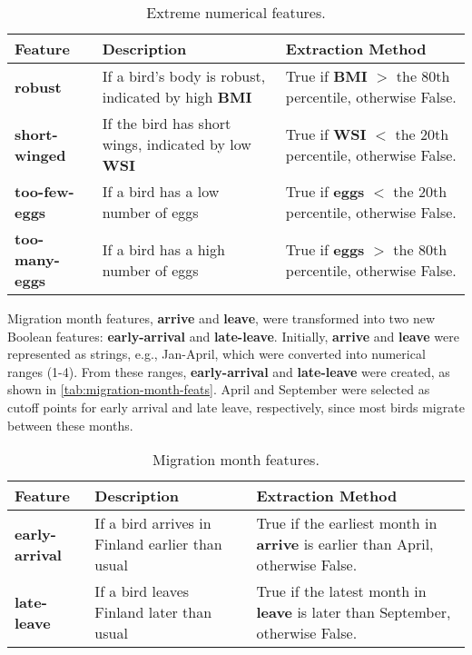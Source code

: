\begin{table}[h]
    \centering
    \begin{tabular}{|p{3cm}|p{6cm}|p{6cm}|}
        \hline
        Feature & Description & Extraction Method \\
        \hline
        \textbf{robust} & If a bird's body is robust, indicated by high \textbf{BMI} &
        True if \textbf{BMI} $>$ the 80th percentile, otherwise False. \\
        \hline
        \textbf{short-winged} & If the bird has short wings, indicated by low 
        \textbf{WSI} & True if \textbf{WSI} $<$ the 20th percentile, 
        otherwise False. \\
        \hline
        \textbf{too-few-eggs} & If a bird has a low number of eggs & True if
        \textbf{eggs} $<$ the 20th percentile, otherwise False. \\
        \hline
        \textbf{too-many-eggs} & If a bird has a high number of eggs & True if
        \textbf{eggs} $>$ the 80th percentile, otherwise False. \\
        \hline
    \end{tabular}
    \caption{Extreme numerical features.}
    \label{tab:extreme-num-vals}
\end{table}

Migration month features, \textbf{arrive} and \textbf{leave}, were transformed
into two new Boolean features: \textbf{early-arrival} and \textbf{late-leave}.
Initially, \textbf{arrive} and \textbf{leave} were represented as strings, 
e.g., Jan-April, which were converted into numerical ranges (1-4). From these
ranges, \textbf{early-arrival} and \textbf{late-leave} were created, as shown
in \autoref{tab:migration-month-feats}. April and September were selected as 
cutoff points for early arrival and late leave, respectively, since most birds
migrate between these months.

\begin{table}[h]
    \centering
    \begin{tabular}{|p{3cm}|p{6cm}|p{6cm}|}
        \hline
        Feature & Description & Extraction Method \\
        \hline
        \textbf{early-arrival} & If a bird arrives in Finland earlier than usual &
        True if the earliest month in \textbf{arrive} is earlier than April, otherwise 
        False. \\
        \hline
        \textbf{late-leave} & If a bird leaves Finland later than usual & True if
        the latest month in \textbf{leave} is later than September, otherwise False. \\
        \hline
    \end{tabular}
    \caption{Migration month features.}
    \label{tab:migration-month-feats}
\end{table}

